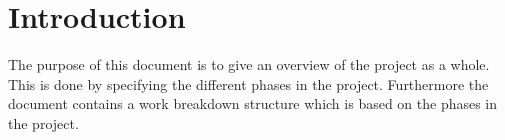 \chapter{Introduction}
The purpose of this document is to give an overview of the project as a whole. This is done by specifying the different phases in the project. Furthermore the document contains a work breakdown structure which is based on the phases in the project. 



